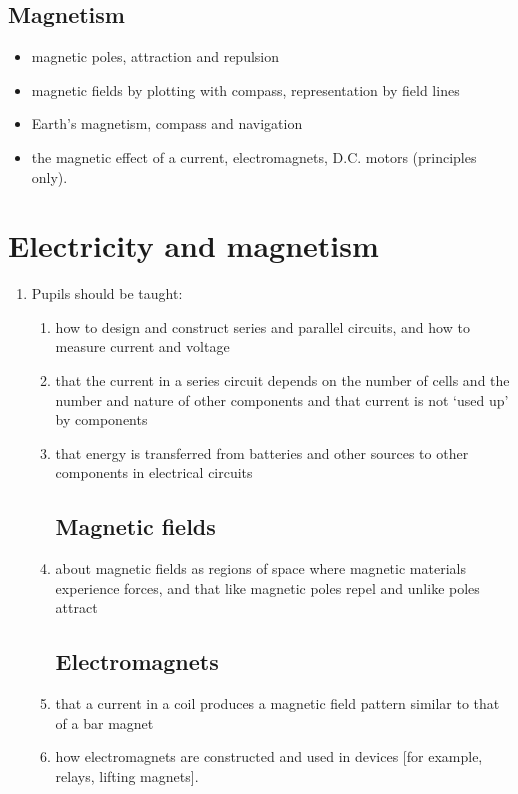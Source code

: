 \documentclass[10pt]{article}
\begin{document}
\begin{paracol}{2}
\subsection{Magnetism}
\begin{itemize}
\item magnetic poles, attraction and repulsion
\item magnetic fields by plotting with compass, representation by field lines
\item Earth's magnetism, compass and navigation
\item the magnetic effect of a current, electromagnets, D.C. motors (principles only).
\end{itemize}

\switchcolumn

\section{Electricity and magnetism}
\begin{enumerate}
\setcounter{enumi}{0}
\item Pupils should be taught:
\begin{enumerate}
\subsection{Circuits}
\item how to design and construct series and parallel circuits, and how to measure
current and voltage
\item that the current in a series circuit depends on the number of cells and the
number and nature of other components and that current is not `used up'
by components
\item that energy is transferred from batteries and other sources to other
components in electrical circuits
\subsection{Magnetic fields}
\item about magnetic fields as regions of space where magnetic materials
experience forces, and that like magnetic poles repel and unlike poles attract
\subsection{Electromagnets}
\item that a current in a coil produces a magnetic field pattern similar to that 
of a bar magnet
\item how electromagnets are constructed and used in devices [for example, relays,
lifting magnets].
\end{enumerate}
\end{enumerate}


\end{paracol}
\end{document}
